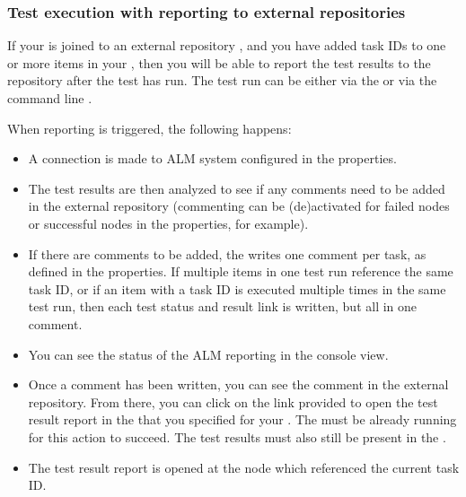 
\subsubsection{Test execution with reporting to external repositories}
If your \gdproject{} is joined to an external repository , and you have added task IDs to one or more items in your \gdproject{} , then you will be able to report the test results to the repository after the test has run. The test run can be either via the \ite{} or via the command line .  


When reporting is triggered, the following happens:
\begin{itemize}
\item A connection is made to ALM system configured in the \gdproject{} properties. 
\item The test results are then analyzed to see if any comments need to be added in the external repository (commenting can be (de)activated for failed nodes or successful nodes in the \gdproject{} properties, for example). 
\item If there are comments to be added, the \ite{} writes one comment per task, as defined in the \gdproject{} properties. If multiple items in one test run reference the same task ID, or if an item with a task ID is executed multiple times in the same test run,  then each test status and result link is written, but all in one comment. 
\item You can see the status of the ALM reporting in the console view. 
\item Once a comment has been written, you can see the comment in the external repository. From there, you can click on the link provided to open the test result report in the \dash{} that you specified for your \gdproject{}. The \dash{} must be already running for this action to succeed. The test results must also still be present in the \gddb{} .
\item The test result report is opened at the node which referenced the current task ID. 
\end{itemize}


